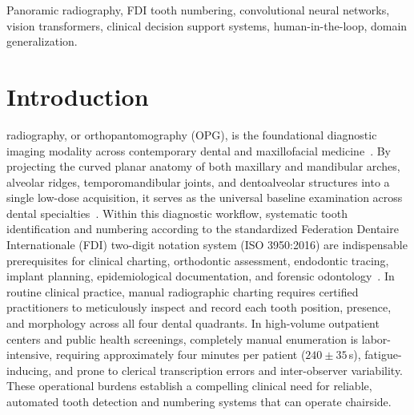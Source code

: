 \documentclass[10pt,journal,compsoc]{IEEEtran}
\begin{document}
{\begin{abstract}
\textbf{Conclusions:} High-resolution imaging ($1280$\,px) coupled with real-time vision transformers provides high internal fidelity and resilient cross-dataset generalizability across unseen panoramic radiographic archives. The deployed human-in-the-loop interface bridges the gap between deep learning benchmarks and chairside dental practice, offering an active pre-annotation framework for continuous clinical data curation.
\end{abstract}

\begin{IEEEkeywords}
Panoramic radiography, FDI tooth numbering, convolutional neural networks, vision transformers, clinical decision support systems, human-in-the-loop, domain generalization.
\end{IEEEkeywords}}

\maketitle
\IEEEdisplaynontitleabstractindextext
\IEEEpeerreviewmaketitle

\section{Introduction}
 radiography, or orthopantomography (OPG), is the foundational diagnostic imaging modality across contemporary dental and maxillofacial medicine~\cite{izzetti2021}. By projecting the curved planar anatomy of both maxillary and mandibular arches, alveolar ridges, temporomandibular joints, and dentoalveolar structures into a single low-dose acquisition, it serves as the universal baseline examination across dental specialties~\cite{izzetti2021,schwendicke2019}. Within this diagnostic workflow, systematic tooth identification and numbering according to the standardized Federation Dentaire Internationale (FDI) two-digit notation system (ISO 3950:2016) are indispensable prerequisites for clinical charting, orthodontic assessment, endodontic tracing, implant planning, epidemiological documentation, and forensic odontology~\cite{fdi1971,iso3950,tuzoff2019}. In routine clinical practice, manual radiographic charting requires certified practitioners to meticulously inspect and record each tooth position, presence, and morphology across all four dental quadrants. In high-volume outpatient centers and public health screenings, completely manual enumeration is labor-intensive, requiring approximately four minutes per patient ($240 \pm 35$\,s), fatigue-inducing, and prone to clerical transcription errors and inter-observer variability. These operational burdens establish a compelling clinical need for reliable, automated tooth detection and numbering systems that can operate chairside.
\end{document}
